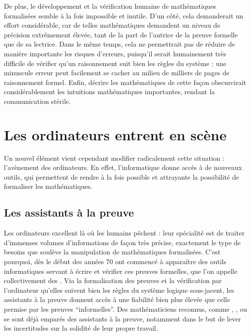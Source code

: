 De plus, le développement et la vérification humaine de mathématiques
formalisées%
semble à la fois impossible et inutile.
D’un côté, cela demanderait un effort considérable, car de telles mathématiques
demandent un niveau de précision extrêmement élevée, tant de la part de l’autrice
de la preuve formelle que de sa lectrice.
Dans le même temps, cela ne permettrait pas de réduire de manière importante
les risques d’erreurs, puisqu’il serait
humainement très difficile de vérifier qu’un raisonnement suit bien les règles du
système : une minuscule erreur peut facilement se cacher au milieu de
milliers de pages de raisonnement formel.
Enfin, décrire les mathématiques de cette façon obscurcirait
considérablement les intuitions mathématiques importantes,
rendant la communication stérile.

\section{Les ordinateurs entrent en scène}
\label{sec:assistants-preuve}

Un nouvel élément vient cependant modifier radicalement cette situation :
l’avènement des ordinateurs. En effet, l’informatique donne accès à de nouveaux outils,
qui permettent de rendre à la fois possible et attrayante la possibilité de formaliser
les mathématiques.

\subsection{Les assistants à la preuve}

Les ordinateurs excellent là où les humains pêchent : leur spécialité est de traiter
d’immenses volumes d’informations de façon très précise, exactement le type
de besoins que soulève la manipulation de mathématiques formalisées. C’est pourquoi, dès
le début des années 70%
ont commencé à apparaître des outils informatiques servant à écrire et vérifier ces
preuves formelles, que l’on appelle collectivement des .
Via la formalisation des preuves et la vérification par l’ordinateur qu’elles
suivent bien les règles du système logique sous-jacent, les assistants à la preuve
donnent accès à une fiabilité bien plus élevée que celle permise par les preuves
“informelles”.
Des mathématiciens reconnus, comme ,
, ou 
se sont déjà emparés des assistants à la preuve,
notamment dans le but de lever les incertitudes
sur la solidité de leur propre travail.

